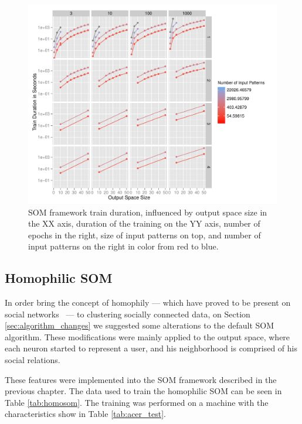 \documentclass[journal]{IEEEtran}
\begin{document}
\begin{figure}[h]
  \centering
  \includegraphics[width=1\linewidth]{./plots/som/benchmarking.pdf}
  \caption{SOM framework train duration, influenced by output space size in the XX axis, duration of the training on the YY axis, number of epochs in the right, size of input patterns on top, and number of input patterns on the right in color from red to blue.}
  \label{fig:benchmarkingsom}
\end{figure}

\subsection{Homophilic SOM}
\label{sec:homophilic_som}
In order bring the concept of homophily --- which have proved to be present on social networks~\cite[]{Wehrens2007}  --- to clustering socially connected data, on Section \ref{sec:algorithm_changes} we suggested some alterations to the default \ac{SOM} algorithm. These modifications were mainly applied to the output space, where each neuron started to represent a user, and his neighborhood is comprised of his social relations.

These features were implemented into the \ac{SOM} framework described in the previous chapter. The data used to train the homophilic \ac{SOM} can be seen in Table \ref{tab:homosom}. The training was performed on a machine with the characteristics show in Table \ref{tab:acer_test}.
\end{document}
